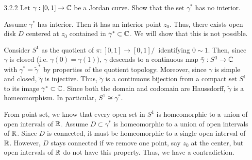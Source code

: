 \documentclass[12pt]{amsart}
\begin{document}
\begin{problem}{3.2.2}
    Let $\gamma: [0, 1] \to \mathbb C$ be a Jordan curve. Show that the set $\gamma^*$ has no interior.
\end{problem}
\begin{solution}
    Assume $\gamma^*$ has interior. Then it has an interior point $z_0$. Thus, there exists open disk $D$ centered at $z_0$ contained in $\gamma^* \subset \mathbb C$. We will show that this is not possible. 

    Consider $S^1$ as the quotient of $\pi: [0, 1] \to [0,1]/~$ identifying $0 \sim 1$. Then, since $\gamma$ is closed (i.e. $\gamma(0) = \gamma(1))$, $\gamma$ descends to a continuous map $\tilde{\gamma}: S^1 \to \mathbb C$ with $\gamma^* = \tilde{\gamma}^*$ by properties of the quotient topology. Moreover, since $\gamma$ is simple and closed, $\tilde{\gamma}$ is injective. Thus, $\tilde{\gamma}$ is a continuous bijection from a compact set $S^1$ to its image $\gamma^* \subset \mathbb C$. Since both the domain and codomain are Haussdorff, $\tilde{\gamma}$ is a homeomorphism. In particular, $S^1 \cong \gamma^*$. 
    
    From point-set, we know that every open set in $S^1$ is homeomorphic to a union of open intervals of $\mathbb R$. Assume $D \subset \gamma^*$ is homeomorphic to a union of open intervals of $\mathbb R$. Since $D$ is connected, it must be homeomorphic to a single open interval of $\mathbb R$. However, $D$ stays connected if we remove one point, say $z_0$ at the center, but open intervals of $\mathbb R$ do not have this property. Thus, we have a contradiction. 
\end{solution}
\newpage
\end{document}
